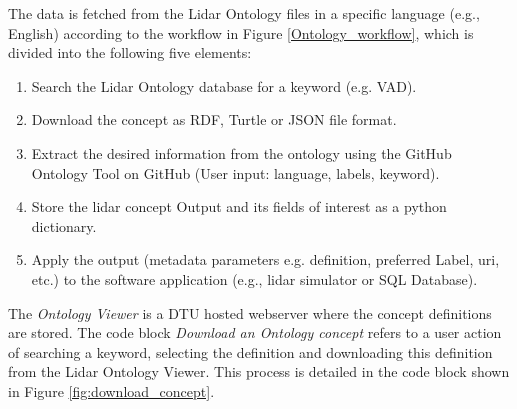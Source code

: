 \documentclass[remotesensing,article,submit,pdftex,moreauthors]{Definitions/mdpi}
\begin{document}
\newpage
The data is fetched from the Lidar Ontology files in a specific language (e.g., English) according to the workflow in Figure \ref{Ontology_workflow}, which is divided into the following five elements:
\begin{enumerate}
    \item Search the Lidar Ontology database for a keyword (e.g. VAD).
    \item Download the concept as RDF, Turtle or JSON file format.
    \item Extract the desired information from the ontology using the GitHub Ontology Tool on GitHub (User input: language, labels, keyword).
    \item Store the lidar concept Output and its fields of interest as a python dictionary.
    \item Apply the output (metadata parameters e.g. definition, preferred Label, uri, etc.) to the software application (e.g., lidar simulator or SQL Database).
\end{enumerate}

The \textit{Ontology Viewer} is a DTU hosted webserver where the concept definitions are stored. The code block \textit{Download an Ontology concept} refers to a user action of searching a keyword, selecting the definition and downloading this definition from the Lidar Ontology Viewer. This process is detailed in the code block shown in Figure \ref{fig:download_concept}. 




\end{document}
